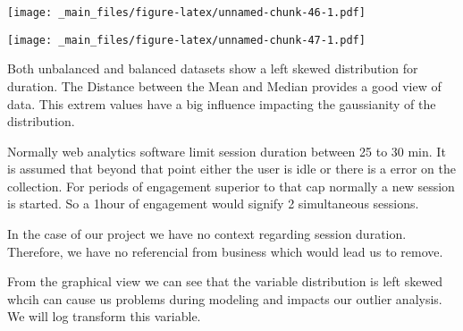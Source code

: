 \documentclass[
]{book}
\newenvironment{Shaded}{\begin{snugshade}}{\end{snugshade}}
\newcommand{\FunctionTok}[1]{\textcolor[rgb]{0.00,0.00,0.00}{#1}}
\newcommand{\NormalTok}[1]{#1}
\newcommand{\SpecialCharTok}[1]{\textcolor[rgb]{0.00,0.00,0.00}{#1}}
\begin{document}
\begin{Shaded}
\end{Shaded}

\texttt{[image: \_main\_files/figure-latex/unnamed-chunk-46-1.pdf]}

\begin{Shaded}
\end{Shaded}

\texttt{[image: \_main\_files/figure-latex/unnamed-chunk-47-1.pdf]}

Both unbalanced and balanced datasets show a left skewed distribution for duration. The Distance between the Mean and Median provides a good view of data. This extrem values have a big influence impacting the gaussianity of the distribution.

Normally web analytics software limit session duration between 25 to 30 min. It is assumed that beyond that point either the user is idle or there is a error on the collection. For periods of engagement superior to that cap normally a new session is started. So a 1hour of engagement would signify 2 simultaneous sessions.

In the case of our project we have no context regarding session duration. Therefore, we have no referencial from business which would lead us to remove.

From the graphical view we can see that the variable distribution is left skewed whcih can cause us problems during modeling and impacts our outlier analysis. We will log transform this variable.
\end{document}
